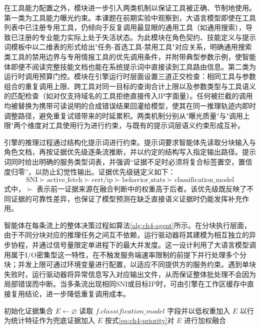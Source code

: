 在工具能力配置之外，模块进一步引入两类机制以保证工具被正确、节制地使用。第一类为工具能力曝光约束。本课题在前期实验中观察到，大语言模型即使在工具列表中已注册专用工具，仍倾向于反复调用最显眼的通用工具（如通用搜索），导致已注册的专业能力实际上处于失活状态。为此模块在角色契约、技能定义与提示词模板中以二维表的形式给出"任务-首选工具-禁用工具"对应关系，明确通用搜索类工具的禁用边界与专用情报工具的优先调用条件，并附带典型参数示例，使智能体即便不阅读完整技能文档也能在系统提示词中直接读到工具路由信息。第二类为运行时调用预算门控。模块在引擎运行时层面设置三道正交检查：相同工具与参数组合的重复调用上限、跨工具对同一目标的查询合计上限以及参数类型与工具语义的匹配检查（如对仅支持域名的工具拒绝直接传入IP字面量）。任何被拦截的调用均被替换为携带可读说明的合成错误结果回灌给模型，使其在同一推理轨迹内即时调整路径，避免重复试错带来的时延累积。两类机制分别从"曝光质量"与"调用上限"两个维度对工具使用行为进行约束，与既有的提示词层语义约束形成互补。

引擎的推理过程通过结构化提示词进行约束。提示词要求智能体先读取分块输入与角色文档，再按证据优先级逐条流推断，并以约定的结构写入指定输出路径。提示词同时给出明确的服务类型词表，并强调“证据不足时必须将复合标签置空，置信度归零”，以防止幻觉性输出。证据优先级链定义如下：
\begin{equation}\label{eq:ch4-priority}
	\mathrm{SNI} \succ \mathrm{active\_fetch} \succ \mathrm{cert/ip} \succ \mathrm{behavior\_stats} \succ \mathrm{classification\_model}
\end{equation}
式中，$\succ$ 表示前一证据来源在融合判断中的权重高于后者。该优先级既反映了不同证据的可靠性差异，也保证了模型预测在缺乏直接语义证据时仍能发挥补充作用。

智能体在每条流上的整体决策过程如算法\ref{alg:ch4-agent}所示。在分块执行层面，由于不同分块对应的推理任务之间互不依赖，运行驱动器将其建模为相互独立的异步协程，并通过信号量限定单进程下的最大并发度。这一设计利用了大语言模型调用属于I/O密集型这一特性，在不触发服务端速率限制的前提下并行处理多个分块；并发上限可通过环境变量进行配置，以适应不同提供方的服务约束。遇到单块失败时，运行驱动器将异常信息写入对应输出文件，从而保证整体批处理不会因为局部错误而中断。当多条流出现相同SNI或目标IP时，可由引擎在工作区缓存中直接复用结论，进一步降低重复调用成本。

\begin{algorithm}[h]
	\caption{智能体单条流量推断流程}\label{alg:ch4-agent}
	
	初始化证据集合 $E \gets \varnothing$\;
	读取 $f.classification\_model$ 字段并以低权重加入 $E$\;
	以行为统计特征作为兜底证据加入 $E$\;
	按式\eqref{eq:ch4-priority}对 $E$ 进行加权融合\;
	\;
\end{algorithm}


